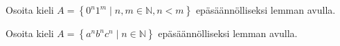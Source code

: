 \documentclass[a4paper,11pt]{article}
\theoremstyle{definition}
\newcommand{\set}[1]{{\left\{ #1 \right\}}}
\newcommand{\Nat}{\mathbb{N}}
\begin{document}
\begin{exercise}
  Osoita kieli $A = \set{0^n1^m \mid n,m \in \Nat, n < m}$
  epä\-sään\-nöl\-li\-sek\-si lemman avulla.
\end{exercise}

\vspace{5mm}

\begin{exercise}
  Osoita kieli $A = \set{a^nb^nc^n \mid n \in \Nat}$ epäsäännölliseksi
  lemman avulla.
\end{exercise}
\end{document}
